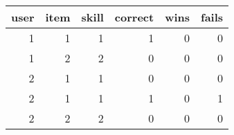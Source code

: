 \begin{tabular}{rrrrrr}
\toprule
 user &  item &  skill &  correct &  wins &  fails \\
\midrule
    1 &     1 &      1 &        1 &     0 &      0 \\
    1 &     2 &      2 &        0 &     0 &      0 \\
    2 &     1 &      1 &        0 &     0 &      0 \\
    2 &     1 &      1 &        1 &     0 &      \alert1 \\
    2 &     2 &      2 &        0 &     0 &      0 \\
\bottomrule
\end{tabular}
